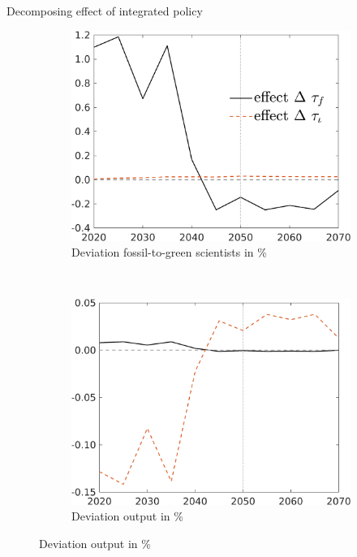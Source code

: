 \documentclass[11pt,aspectratio=169]{beamer}
\begin{document}
\begin{frame}{Decomposing effect of integrated policy}
	\hypertarget{mec0}{}
	\vspace{-3mm}
	\centering
	\begin{figure}
		\begin{subfigure}{0.45\textwidth}
			\caption{{Deviation fossil-to-green scientists in \% }}
			\includegraphics[width=1\textwidth]{../codding_model/own_basedOnFried/optimalPol_010922_revision/figures/all_13Sept22/NewCalib_polTaulFixedTaufJointPer_sffsg_Sun2_emnet1_spillover0_knspil3_xgr0_nsk0_sep0_extern0_PV1_etaa0.79_lgd1.png}
		\end{subfigure}
		\begin{minipage}[]{0.05\textwidth}
			\
		\end{minipage}
		\begin{subfigure}{0.45\textwidth}
			\caption{{Deviation output in \%}}
			\includegraphics[width=1\textwidth]{../codding_model/own_basedOnFried/optimalPol_010922_revision/figures/all_13Sept22/NewCalib_polTaulFixedTaufJointPer_Y_Sun2_emnet1_spillover0_knspil3_xgr0_nsk0_sep0_extern0_PV1_etaa0.79_lgd0.png}

\end{subfigure}
\end{figure}
\end{frame}
\end{document}
